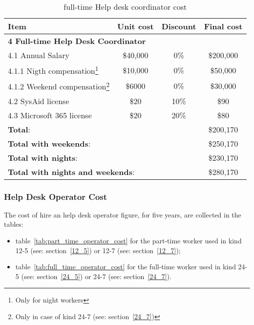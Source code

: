 \begin{minipage}{15cm}
	\begin{table}[H]
		\centering
		\begin{tabular}{|l|c|c|c|} 
			\hline
			\textbf{Item} & \textbf{Unit cost} & \textbf{Discount} & \textbf{Final cost}   \\
			\hline
			\multicolumn{4}{|l|}{\textbf{4 Full-time Help Desk Coordinator}}\\
			\hline
			\hspace{2mm}4.1  Annual Salary & \$40,000 & 0\% & \$200,000\\
			\hline
			\hspace{4mm}4.1.1 Nigth compensation\footnote{Only for night workers} & \$10,000 & 0\% & \$50,000 \\
			\hline
			\hspace{4mm}4.1.2 Weekend compensation\footnote{Only in case of kind 24{-}7 (see: section~\ref{24_7})}& \$6000 & 0\% & \$30,000 \\
			\hline
			\hspace{2mm}4.2 SysAid license & \$20 & 10\% & \$90 \\
			\hline
			\hspace{2mm}4.3 Microsoft 365 license  & \$20 & 20\% & \$80 \\
			\hline
			\multicolumn{3}{|l|}{\textbf{Total}:} & \$200,170\\
			\hline
			\multicolumn{3}{|l|}{\textbf{Total with weekends}:} & \$250,170\\
			\hline
			\multicolumn{3}{|l|}{\textbf{Total with nights}:} & \$230,170\\
			\hline
			\multicolumn{3}{|l|}{\textbf{Total with nights and weekends}:} & \$280,170\\
			\hline
		\end{tabular}
		\caption{full-time Help desk coordinator cost}\label{tab:full_time_coordinator_cost}
	\end{table}
\end{minipage}

\subsubsection{Help Desk Operator Cost}
The cost of hire an help desk operator figure, for five years, are collected in the tables:
\begin{itemize}
	\item table~\ref{tab:part_time_operator_cost} for the part-time worker used in kind 12{-}5 (see: section~\ref{12_5}) or 12{-}7 (see: section~\ref{12_7});
	\item table~\ref{tab:full_time_operator_cost} for the full-time worker used in kind 24{-}5 (see: section~\ref{24_5}) or 24{-}7 (see: section~\ref{24_7}).
\end{itemize}

